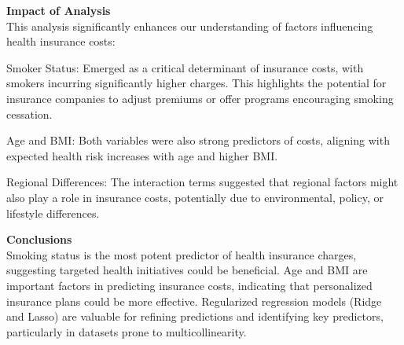 \documentclass[
  12pt,
]{article}
\begin{document}
\textbf{Impact of Analysis}\\
This analysis significantly enhances our understanding of factors
influencing health insurance costs:

Smoker Status: Emerged as a critical determinant of insurance costs,
with smokers incurring significantly higher charges. This highlights the
potential for insurance companies to adjust premiums or offer programs
encouraging smoking cessation.

Age and BMI: Both variables were also strong predictors of costs,
aligning with expected health risk increases with age and higher BMI.

Regional Differences: The interaction terms suggested that regional
factors might also play a role in insurance costs, potentially due to
environmental, policy, or lifestyle differences.

\textbf{Conclusions}\\
Smoking status is the most potent predictor of health insurance charges,
suggesting targeted health initiatives could be beneficial. Age and BMI
are important factors in predicting insurance costs, indicating that
personalized insurance plans could be more effective. Regularized
regression models (Ridge and Lasso) are valuable for refining
predictions and identifying key predictors, particularly in datasets
prone to multicollinearity.
\end{document}
